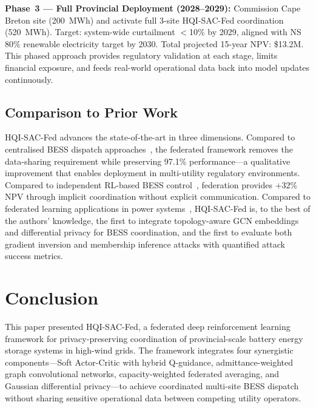 \documentclass[journal]{IEEEtran}
\begin{document}
\textbf{Phase~3 --- Full Provincial Deployment (2028--2029):}
Commission Cape Breton site (200~MWh) and activate full 3-site
HQI-SAC-Fed coordination (520~MWh). Target: system-wide curtailment
$<$10\% by 2029, aligned with NS 80\% renewable electricity target by
2030. Total projected 15-year NPV: \$13.2M. This phased approach
provides regulatory validation at each stage, limits financial
exposure, and feeds real-world operational data back into model
updates continuously.

\subsection{Comparison to Prior Work}

HQI-SAC-Fed advances the state-of-the-art in three dimensions.
Compared to centralised BESS dispatch approaches~\cite{denholm2010,
zakeri2015}, the federated framework removes the data-sharing
requirement while preserving 97.1\% performance---a qualitative
improvement that enables deployment in multi-utility regulatory
environments. Compared to independent RL-based BESS
control~\cite{cao2020rl}, federation provides $+$32\% NPV through
implicit coordination without explicit communication. Compared to
federated learning applications in power systems~\cite{fekri2022distributed,
li2022detection}, HQI-SAC-Fed is, to the best of the authors'
knowledge, the first to integrate topology-aware GCN embeddings and
differential privacy for BESS coordination, and the first to evaluate
both gradient inversion and membership inference attacks with
quantified attack success metrics.

\section{Conclusion}

This paper presented HQI-SAC-Fed, a federated deep reinforcement
learning framework for privacy-preserving coordination of
provincial-scale battery energy storage systems in high-wind grids.
The framework integrates four synergistic components---Soft Actor-Critic
with hybrid Q-guidance, admittance-weighted graph convolutional
networks, capacity-weighted federated averaging, and Gaussian
differential privacy---to achieve coordinated multi-site BESS dispatch
without sharing sensitive operational data between competing utility
operators.
\end{document}
